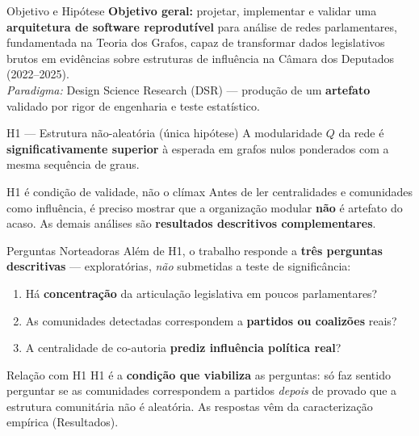\documentclass{beamer}
\begin{document}
\begin{frame}{Objetivo e Hipótese}
\textbf{Objetivo geral:} projetar, implementar e validar uma \textbf{arquitetura de software reprodutível} para análise de redes parlamentares, fundamentada na Teoria dos Grafos, capaz de transformar dados legislativos brutos em evidências sobre estruturas de influência na Câmara dos Deputados (2022--2025). \\
\footnotesize \textit{Paradigma:} Design Science Research (DSR) — produção de um \textbf{artefato} validado por rigor de engenharia e teste estatístico. \normalsize

\vspace{0.2cm}
\begin{block}{H1 — Estrutura não-aleatória (única hipótese)}
A modularidade $Q$ da rede é \textbf{significativamente superior} à esperada em grafos nulos ponderados com a mesma sequência de graus.
\end{block}
\begin{alertblock}{H1 é condição de validade, não o clímax}
Antes de ler centralidades e comunidades como influência, é preciso mostrar que a organização modular \textbf{não} é artefato do acaso. As demais análises são \textbf{resultados descritivos complementares}.
\end{alertblock}
\end{frame}

\begin{frame}{Perguntas Norteadoras}
Além de H1, o trabalho responde a \textbf{três perguntas descritivas} — exploratórias, \textit{não} submetidas a teste de significância:

\vspace{0.2cm}
\begin{enumerate}
  \item[(i)] Há \textbf{concentração} da articulação legislativa em poucos parlamentares?
  \item[(ii)] As comunidades detectadas correspondem a \textbf{partidos ou coalizões} reais?
  \item[(iii)] A centralidade de co-autoria \textbf{prediz influência política real}?
\end{enumerate}

\vspace{0.2cm}
\begin{block}{Relação com H1}
\footnotesize H1 é a \textbf{condição que viabiliza} as perguntas: só faz sentido perguntar se as comunidades correspondem a partidos \textit{depois} de provado que a estrutura comunitária não é aleatória. As respostas vêm da caracterização empírica (Resultados).
\end{block}
\end{frame}
\end{document}
